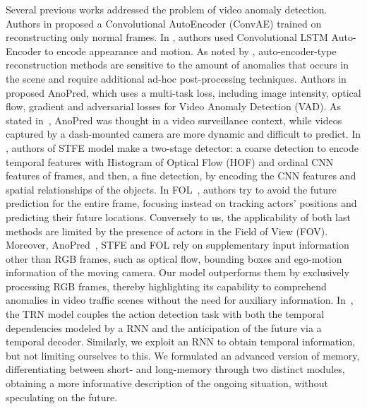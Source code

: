 Several previous works addressed the problem of video anomaly detection.
Authors in \cite{hasan2016learning} proposed a Convolutional AutoEncoder (ConvAE) trained on reconstructing only normal frames.
In \cite{luo2017remembering,wang2018abnormal}, authors used Convolutional LSTM Auto-Encoder to encode appearance and motion.
As noted by \cite{ramachandra2020survey}, auto-encoder-type reconstruction methods are sensitive to the amount of anomalies that occurs in the scene and require additional ad-hoc post-processing techniques.
Authors in \cite{liu2018future} proposed AnoPred, which uses a multi-task loss, including image intensity, optical flow, gradient and adversarial losses for Video Anomaly Detection (VAD).
As stated in~\cite{9712446}, AnoPred was thought in a video surveillance context, while videos captured by a dash-mounted camera are more dynamic and difficult to predict.
In \cite{zhou_spatio-temporal_2022}, authors of STFE model make a two-stage detector: a coarse detection to encode temporal features with Histogram of Optical Flow (HOF) \cite{wang2013action} and ordinal CNN features of frames, and then, a fine detection, by encoding the CNN features and spatial relationships of the objects.
In FOL~\cite{9712446}, authors try to avoid the future prediction for the entire frame, focusing instead on tracking actors' positions and predicting their future locations.
Conversely to us, the applicability of both last methods are limited by the presence of actors in the Field of View (FOV).
Moreover, AnoPred~\cite{liu2018future}, STFE \cite{zhou_spatio-temporal_2022} and FOL \cite{9712446} rely on supplementary input information other than RGB frames, such as optical flow, bounding boxes and ego-motion information of the moving camera.
Our model outperforms them by exclusively processing RGB frames, thereby highlighting its capability to comprehend anomalies in video traffic scenes without the need for auxiliary information.
In~\cite{xu2019temporal}, the TRN model couples the action detection task with both the temporal dependencies modeled by a RNN and the anticipation of the future via a temporal decoder.
Similarly, we exploit an RNN to obtain temporal information, but not limiting ourselves to this.
We formulated an advanced version of memory, differentiating between short- and long-memory through two distinct %
modules, obtaining a more informative description of the ongoing situation, without speculating on the future.
